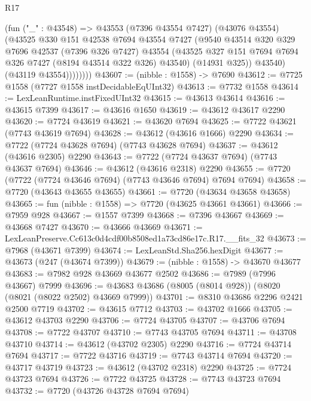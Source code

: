 \begin{lexlean}{R17}
\begin{coremodule}
                (fun ("_" : @43548) =>
                @43553
                  (@7396 @43554 @7427)
                  (@43076 @43554)
                  (@43525
                    @330
                    @151
                    @42538
                    @7694
                    @43554
                    @7427
                    (@9540
                      @43514
                      @320
                      @329
                      @7696
                      @42537
                      (@7396 @326 @7427)
                      @43554
                      (@43525 @327 @151 @7694 @7694 @326 @7427 (@8194 @43514 @322 @326) @43540)
                      (@14931 @325))
                    @43540)
                  (@43119 @43554))))))))
@43607 := (nibble : @1558) -> @7690
@43612 := @7725 @1558 (@7727 @1558 instDecidableEqUInt32)
@43613 := @7732 @1558
@43614 := LexLeanRuntime.instFixedUInt32
@43615 := @43613 @43614
@43616 := @43615 @7399
@43617 := @43616 @1650
@43619 := @43612 @43617 @2290
@43620 := @7724 @43619
@43621 := @43620 @7694
@43625 := @7722 @43621 (@7743 @43619 @7694)
@43628 := @43612 (@43616 @1666) @2290
@43634 := @7722 (@7724 @43628 @7694) (@7743 @43628 @7694)
@43637 := @43612 (@43616 @2305) @2290
@43643 := @7722 (@7724 @43637 @7694) (@7743 @43637 @7694)
@43646 := @43612 (@43616 @2318) @2290
@43655 := @7720 (@7722 (@7724 @43646 @7694) (@7743 @43646 @7694) @7694 @7694)
@43658 := @7720 (@43643 @43655 @43655)
@43661 := @7720 (@43634 @43658 @43658)
@43665 := fun (nibble : @1558) => @7720 (@43625 @43661 @43661)
@43666 := @7959 @928
@43667 := @1557 @7399
@43668 := @7396 @43667
@43669 := @43668 @7427
@43670 := @43666 @43669
@43671 := LexLeanPreserve.Cc613c0d4cdf00b8508ed1a73cd86e17c.R17.__fits_32
@43673 := @7968 (@43671 @7399)
@43674 := LexLeanStd.Sha256.hexDigit
@43677 := @43673 (@247 (@43674 @7399))
@43679 := (nibble : @1558) -> @43670 @43677
@43683 := @7982 @928 @43669 @43677 @2502
@43686 := @7989 (@7996 @43667) @7999
@43696 := @43683 @43686 (@8005 (@8014 @928)) (@8020 (@8021 (@8022 @2502) @43669 @7999))
@43701 := @8310 @43686 @2296 @2421 @2500 @7719
@43702 := @43615 @7712
@43703 := @43702 @1666
@43705 := @43612 @43703 @2290
@43706 := @7724 @43705
@43707 := @43706 @7694
@43708 := @7722 @43707
@43710 := @7743 @43705 @7694
@43711 := @43708 @43710
@43714 := @43612 (@43702 @2305) @2290
@43716 := @7724 @43714 @7694
@43717 := @7722 @43716
@43719 := @7743 @43714 @7694
@43720 := @43717 @43719
@43723 := @43612 (@43702 @2318) @2290
@43725 := @7724 @43723 @7694
@43726 := @7722 @43725
@43728 := @7743 @43723 @7694
@43732 := @7720 (@43726 @43728 @7694 @7694)

\end{coremodule}
\end{lexlean}
